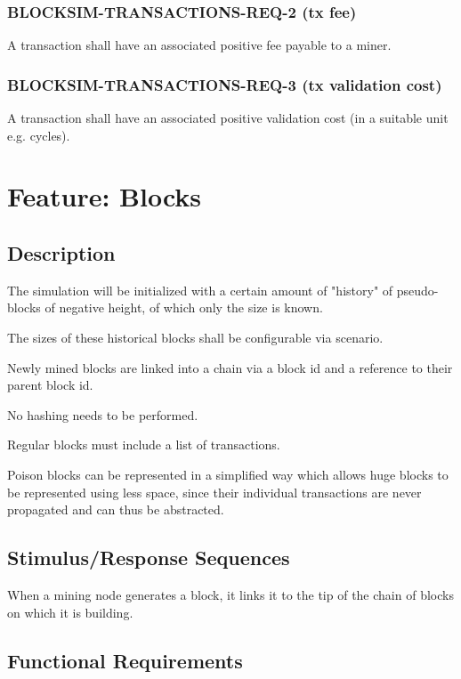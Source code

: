 \documentclass{scrreprt}
\begin{document}
\subsubsection{BLOCKSIM-TRANSACTIONS-REQ-2 (tx fee)}

A transaction shall have an associated positive fee payable to a miner.

\subsubsection{BLOCKSIM-TRANSACTIONS-REQ-3 (tx validation cost)}

A transaction shall have an associated positive validation cost (in a suitable unit e.g. cycles).



\section{Feature: Blocks}

\subsection{Description}

The simulation will be initialized with a certain amount of "history" of
pseudo-blocks of negative height, of which only the size is known.

The sizes of these historical blocks shall be configurable via scenario.

Newly mined blocks are linked into a chain via a block id and a reference
to their parent block id.

No hashing needs to be performed.

Regular blocks must include a list of transactions.

Poison blocks can be represented in a simplified way which allows huge
blocks to be represented using less space, since their individual
transactions are never propagated and can thus be abstracted.


\subsection{Stimulus/Response Sequences}

When a mining node generates a block, it links it to the tip of the chain
of blocks on which it is building.


\subsection{Functional Requirements}
\end{document}
